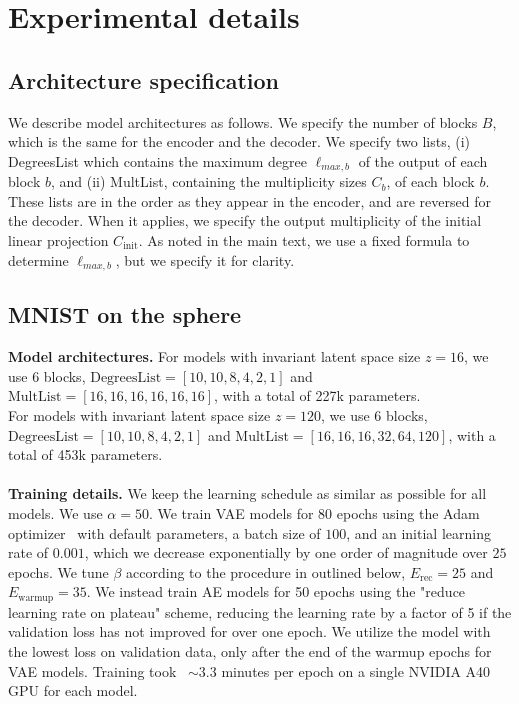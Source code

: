 \section{Experimental details}
\label{sec:exp_details}

\subsection{Architecture specification}
We describe model architectures as follows. We specify the number of blocks $B$, which is the same
for the encoder and the decoder. We specify two lists, (i) DegreesList which contains the maximum
degree $\ell_{{max},b}$ of the output of each block $b$, and (ii) MultList, containing the
multiplicity sizes $C_{b}$, of each block $b$. These lists are in the order as they appear in the
encoder, and are reversed for the decoder. When it applies, we specify the output multiplicity of
the initial linear projection $C_\text{init}$. As noted in the main text, we use a fixed formula to
determine $\ell_{{max},b}$, but we specify it for clarity.


\subsection{MNIST on the sphere}
\label{sec:mnist_details}
\textbf{Model architectures.}
For models with invariant latent space size $z = 16$, we use 6 blocks, $\text{DegreesList} = [10,
10, 8, 4, 2, 1]$ and $\text{MultList} = [16, 16, 16, 16, 16, 16]$, with a total of 227k
parameters.\\
For models with invariant latent space size $z = 120$, we use 6 blocks, $\text{DegreesList} = [10,
10, 8, 4, 2, 1]$ and $\text{MultList} = [16, 16, 16, 32, 64, 120]$, with a total of 453k
parameters.\\
\\
\textbf{Training details.}
We keep the learning schedule as similar as possible for all models. We use $\alpha = 50$. We train
VAE models for $80$ epochs using the Adam optimizer~\cite{kingma_adam_2017} with
default parameters, a batch size of $100$, and an initial learning rate of $0.001$, which we
decrease exponentially by one order of magnitude over $25$ epochs. We tune $\beta$
according to the procedure in outlined below, $E_\text{rec} = 25$ and $E_\text{warmup} = 35$.
We instead train AE models for 50 epochs using the "reduce learning rate on plateau"
scheme, reducing the learning rate by a factor of 5 if the validation loss has not improved for
over one epoch. We utilize the model with the lowest loss on validation data, only after the end
of the warmup epochs for VAE models. Training took ~$\sim 3.3$ minutes per epoch on a
single NVIDIA A40 GPU for each model.\\
\\

